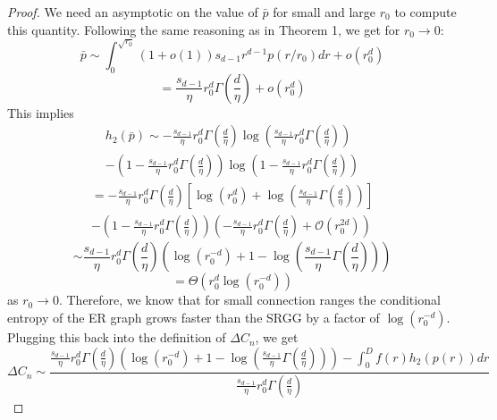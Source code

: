 \documentclass{article}
\newcommand{\bigO}[1]{\mathcal{O}\left(#1\right)}
\newcommand{\ttz}[0]{\rightarrow 0}
\begin{document}
\begin{proof}
        We need an asymptotic on the value of $\bar{p}$ for small and large $r_0$ to compute this quantity. Following the same reasoning as in Theorem 1, we get for $r_0 \ttz$:
    \begin{equation}
        \bar{p} \sim \int_0^{\sqrt{r_0}}(1+o(1))s_{d-1}r^{d-1}p(r/r_0)dr + o(r_0^d)
    \end{equation}
    \begin{equation}
        = \frac{s_{d-1}}{\eta}r_0^d \Gamma\left(\frac{d}{\eta}\right) + o(r_0^d)
    \end{equation}
    This implies
    \begin{gather}
        h_2(\bar{p}) \sim -\frac{s_{d-1}}{\eta}r_0^d\Gamma\left(\frac{d}{\eta}\right)\log\left(\frac{s_{d-1}}{\eta}r_0^d\Gamma\left(\frac{d}{\eta}\right)\right) \nonumber \\
        -\left(1-\frac{s_{d-1}}{\eta}r_0^d\Gamma\left(\frac{d}{\eta}\right)\right)\log\left(1-\frac{s_{d-1}}{\eta}r_0^d\Gamma\left(\frac{d}{\eta}\right)\right)
    \end{gather}
    \begin{gather}
        = -\frac{s_{d-1}}{\eta}r_0^d\Gamma\left(\frac{d}{\eta}\right)\left[\log(r_0^d) +\log\left(\frac{s_{d-1}}{\eta}\Gamma\left(\frac{d}{\eta}\right)\right)\right] \nonumber \\
        - \left(1-\frac{s_{d-1}}{\eta}r_0^d\Gamma\left(\frac{d}{\eta}\right)\right)\left(-\frac{s_{d-1}}{\eta}r_0^d\Gamma\left(\frac{d}{\eta}\right) + \bigO{r_0^{2d}}\right)
    \end{gather}
    \begin{equation}
        \sim \frac{s_{d-1}}{\eta}r_0^d\Gamma\left(\frac{d}{\eta}\right)\left(\log(r_0^{-d}) + 1 - \log\left(\frac{s_{d-1}}{\eta}\Gamma\left(\frac{d}{\eta}\right)\right)\right)
    \end{equation}
    \begin{equation}
        = \Theta(r_0^d\log(r_0^{-d}))
    \end{equation}
    as $r_0 \rightarrow 0$. Therefore, we know that for small connection ranges the conditional entropy of the ER graph grows faster than the SRGG by a factor of $\log(r_0^{-d})$. Plugging this back into the definition of $\Delta C_n$, we get
    \begin{equation}
        \Delta C_n \sim \frac{\frac{s_{d-1}}{\eta}r_0^d\Gamma\left(\frac{d}{\eta}\right)\left(\log(r_0^{-d}) + 1 - \log\left(\frac{s_{d-1}}{\eta}\Gamma\left(\frac{d}{\eta}\right)\right)\right) - \int_0^Df(r)h_2(p(r))dr}{\frac{s_{d-1}}{\eta}r_0^d\Gamma\left(\frac{d}{\eta}\right)}

\end{equation}
\end{proof}
\end{document}
